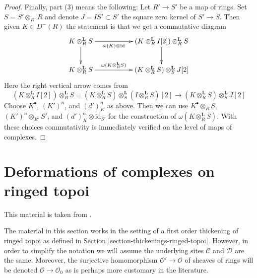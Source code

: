 \begin{proof}
\medskip\noindent
Finally, part (3) means the following: Let $R' \to S'$ be a map of
rings. Set $S = S' \otimes_{R'} R$ and denote $J = IS' \subset S'$
the square zero kernel of $S' \to S$. Then given $K \in D^-(R)$
the statement is that we get a commutative diagram
$$
\xymatrix{
K \otimes_R^\mathbf{L} S \ar[d] \ar[rr]_-{\omega(K) \otimes \text{id}} & &
(K \otimes^\mathbf{L}_R I[2]) \otimes_R^\mathbf{L} S \ar[d] \\
K \otimes_R^\mathbf{L} S \ar[rr]^-{\omega(K \otimes_R^\mathbf{L} S)} & &
(K \otimes_R^\mathbf{L} S) \otimes^\mathbf{L}_S J[2]
}
$$
Here the right vertical arrow comes from
$$
(K \otimes^\mathbf{L}_R I[2]) \otimes_R^\mathbf{L} S =
(K \otimes_R^\mathbf{L} S) \otimes_S^\mathbf{L}
(I \otimes_R^\mathbf{L} S)[2] \longrightarrow
(K \otimes_R^\mathbf{L} S) \otimes_S^\mathbf{L} J[2]
$$
Choose $K^\bullet$, $(K')^n$, and $(d')^n_K$ as above.
Then we can use $K^\bullet \otimes_R S$, $(K')^n \otimes_{R'} S'$, and
$(d')^n_K \otimes \text{id}_{S'}$ for the construction of
$\omega(K \otimes_R^\mathbf{L} S)$.
With these choices commutativity
is immediately verified on the level of maps of complexes.
\end{proof}







\section{Deformations of complexes on ringed topoi}
\label{section-thickenings-complexes}

\noindent
This material is taken from \cite{lieblich-complexes}.

\medskip\noindent
The material in this section works in the setting of a first order thickening
of ringed topoi as defined in Section \ref{section-thickenings-ringed-topoi}.
However, in order to simplify the notation we will assume the underlying
sites $\mathcal{C}$ and $\mathcal{D}$ are the same.
Moreover, the surjective homomorphism $\mathcal{O}' \to \mathcal{O}$
of sheaves of rings will be denoted $\mathcal{O} \to \mathcal{O}_0$
as is perhaps more customary in the literature.

